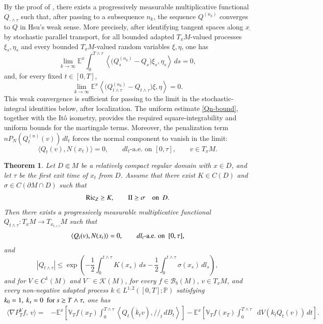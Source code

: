 \documentclass[11pt,twoside, reqno]{article}
\newcommand{\ed}{\mathop{}\!\mathrm{d}}
\def\mathpal#1{\mathop{\mathchoice{\text{\rm #1}}%
   {\text{\rm #1}}{\text{\rm #1}}%
   {\text{\rm #1}}}\nolimits}
\newcommand\Ric{\mathpal{Ric}}
\newcommand\1{\mathbbm{1}}
\newcommand\II{\mathrm{II}}
\newtheorem{theorem}{Theorem}[section]
\theoremstyle{definition}
\numberwithin{equation}{section}
\begin{document}
By the proof of \cite[Theorem~1.1]{Wbook14}, there exists a progressively
measurable multiplicative functional \(Q_{\cdot\wedge\tau}\) such that, after
passing to a subsequence \(n_k\), the sequence \(Q^{(n_k)}\) converges to \(Q\)
in Hsu's weak sense. More precisely, after identifying tangent spaces along
\(x_{\cdot}\) by stochastic parallel transport,  for all bounded adapted \(T_xM\)-valued processes \(\xi_s,\eta_s\) and every bounded \(T_xM\)-valued random variables
\(\xi,\eta\), one has
\[
\lim_{k\to\infty}
\mathbb E^x
\int_0^{T\wedge\tau}
\left\langle
\bigl(Q_s^{(n_k)}-Q_s\bigr)\xi_s,\eta_s
\right\rangle\,ds
=0,
\]
and, for every fixed \(t\in[0,T]\),
\[
\lim_{k\to\infty}
\mathbb E^x
\left\langle
\bigl(Q_{t\wedge\tau}^{(n_k)}-Q_{t\wedge\tau}\bigr)\xi,\eta
\right\rangle
=0 .
\]
This weak convergence is sufficient for passing to the limit in the
stochastic-integral identities below, after localization. The uniform estimate
\eqref{Qn-bound}, together with the It\^o isometry, provides the required
square-integrability and uniform bounds for the martingale terms. Moreover, the
penalization term \(nP_N(Q_t^{(n)}(v))\,dl_t\) forces the normal component to
vanish in the limit:
\[
        \langle Q_t(v),N(x_t)\rangle=0,
        \qquad dl_t\text{-a.e. on }[0,\tau],
        \qquad v\in T_xM.
\]

\begin{theorem}\label{BisF-Neumann}
Let $D\Subset M$ be a relatively compact regular domain with $x\in D$, and
let $\tau$ be the first exit time of $x_t$ from $D$. 
Assume that there exist $K\in C(D)$ and
$\sigma\in C(\partial M\cap D)$ such that
\[
        \Ric_Z\geq K,
        \qquad
        \II\geq \sigma
        \quad \hbox{on \  }D .
\]
Then there exists a progressively measurable multiplicative functional
\(
        Q_{t\wedge\tau}:T_xM\to T_{x_{t\wedge\tau}}M
\)
such that
\[
        \langle Q_t(v),N(x_t)\rangle=0,
        \qquad dl_t\hbox{-a.e. on \  }[0,\tau],
\]
and
\[
        |Q_{t\wedge\tau}|
        \leq
        \exp\left(
        -\frac12\int_0^{t\wedge\tau}K(x_s)\,ds
        -\frac12\int_0^{t\wedge\tau}\sigma(x_s)\,dl_s
        \right),
\]
and for  $V\in C^1(M)$ and $V^-\in \mathcal K(M)$,  for every
$f\in\mathcal B_b(M)$, $v\in T_xM$, and every non-negative adapted process
$k\in L^{1,2}([0,T];\mathbb P)$ satisfying
\(
        k_0=1, \ 
        k_s=0\ \ \hbox{for }s\geq T\wedge\tau,
\)
one has
\begin{equation}\label{Bismut-F1}
\begin{aligned}
       \langle \nabla P_T^Vf, \, v\rangle
        =&-\mathbb E^x\left[
        \mathbb V_T f(x_T)
        \int_0^{T\wedge\tau}
        \left\langle Q_t(\dot k_t v),/\!/_t\,dB_t\right\rangle
        \right]
      -\mathbb E^x\left[
        \mathbb V_T f(x_T)
        \int_0^{T\wedge\tau}
        \ed V(k_tQ_t(v))\,dt
        \right].
\end{aligned}
\end{equation}
\end{theorem}
\end{document}
